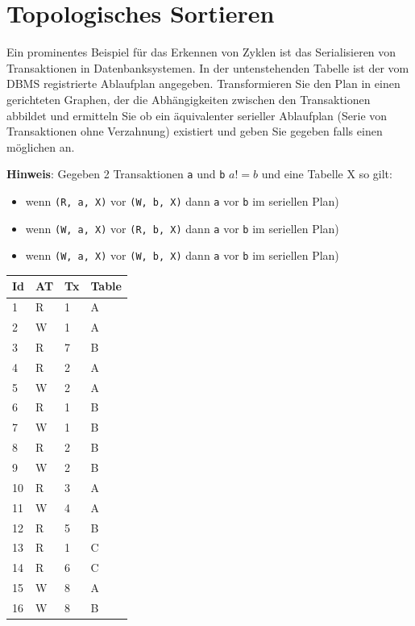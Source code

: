 \documentclass[a4paper,11pt]{report}
\begin{document}
    \newpage

    \chapter{Topologisches Sortieren}
    Ein prominentes Beispiel für das Erkennen von Zyklen ist das Serialisieren von Transaktionen in Datenbanksystemen.
    In der untenstehenden Tabelle ist der vom DBMS registrierte Ablaufplan angegeben.
    Transformieren Sie den Plan in einen gerichteten Graphen, der die Abhängigkeiten zwischen den Transaktionen abbildet und ermitteln Sie ob ein äquivalenter serieller Ablaufplan
    (Serie von Transaktionen ohne Verzahnung)
    existiert und geben Sie gegeben falls einen möglichen an.

    \textbf{Hinweis}: Gegeben 2 Transaktionen \texttt{a} und \texttt{b} $a != b$ und eine Tabelle X so gilt:

    \begin{itemize}
        \item wenn \texttt{(R, a, X)} vor \texttt{(W, b, X)} dann \texttt{a} vor \texttt{b} im seriellen Plan)
        \item wenn \texttt{(W, a, X)} vor \texttt{(R, b, X)} dann \texttt{a} vor \texttt{b} im seriellen Plan)
        \item wenn \texttt{(W, a, X)} vor \texttt{(W, b, X)} dann \texttt{a} vor \texttt{b} im seriellen Plan)
    \end{itemize}


    \begin{table}[htbp]
        \centering
        \begin{tabular}{|l|l|l|l|}
            \hline
            Id & AT & Tx & Table \\ \hline
            1  & R  & 1  & A     \\ \hline
            2  & W  & 1  & A     \\ \hline
            3  & R  & 7  & B     \\ \hline
            4  & R  & 2  & A     \\ \hline
            5  & W  & 2  & A     \\ \hline
            6  & R  & 1  & B     \\ \hline
            7  & W  & 1  & B     \\ \hline
            8  & R  & 2  & B     \\ \hline
            9  & W  & 2  & B     \\ \hline
            10 & R  & 3  & A     \\ \hline
            11 & W  & 4  & A     \\ \hline
            12 & R  & 5  & B     \\ \hline
            13 & R  & 1  & C     \\ \hline
            14 & R  & 6  & C     \\ \hline
            15 & W  & 8  & A     \\ \hline
            16 & W  & 8  & B     \\ \hline
        \end{tabular}
    \end{table}
\end{document}
